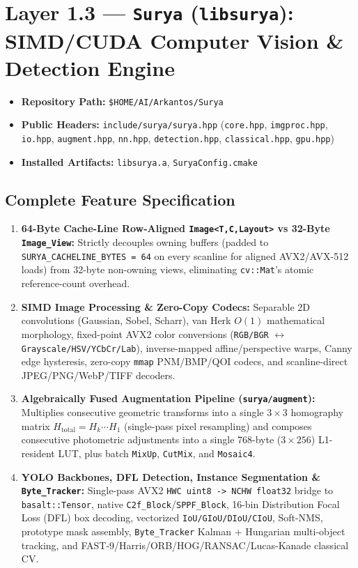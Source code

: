 \documentclass[11pt,a4paper]{article}
\begin{document}
\section{Layer 1.3 --- \texttt{Surya} (\texttt{libsurya}): SIMD/CUDA Computer Vision \& Detection Engine}

\begin{itemize}[leftmargin=1.5em,itemsep=1pt]
  \item \textbf{Repository Path:} \texttt{\$HOME/AI/Arkantos/Surya}
  \item \textbf{Public Headers:} \texttt{include/surya/surya.hpp} (\texttt{core.hpp}, \texttt{imgproc.hpp}, \texttt{io.hpp}, \texttt{augment.hpp}, \texttt{nn.hpp}, \texttt{detection.hpp}, \texttt{classical.hpp}, \texttt{gpu.hpp})
  \item \textbf{Installed Artifacts:} \texttt{libsurya.a}, \texttt{SuryaConfig.cmake}
\end{itemize}

\subsection{Complete Feature Specification}
\begin{enumerate}[leftmargin=1.5em]
  \item \textbf{64-Byte Cache-Line Row-Aligned \texttt{Image<T,C,Layout>} vs 32-Byte \texttt{Image\_View}:} Strictly decouples owning buffers (padded to \texttt{SURYA\_CACHELINE\_BYTES = 64} on every scanline for aligned AVX2/AVX-512 loads) from 32-byte non-owning views, eliminating \texttt{cv::Mat}'s atomic reference-count overhead.
  \item \textbf{SIMD Image Processing \& Zero-Copy Codecs:} Separable 2D convolutions (Gaussian, Sobel, Scharr), van Herk $O(1)$ mathematical morphology, fixed-point AVX2 color conversions (\texttt{RGB/BGR} $\leftrightarrow$ \texttt{Grayscale/HSV/YCbCr/Lab}), inverse-mapped affine/perspective warps, Canny edge hysteresis, zero-copy \texttt{mmap} PNM/BMP/QOI codecs, and scanline-direct JPEG/PNG/WebP/TIFF decoders.
  \item \textbf{Algebraically Fused Augmentation Pipeline (\texttt{surya/augment}):} Multiplies consecutive geometric transforms into a single $3\times 3$ homography matrix $H_{\text{total}} = H_k \cdots H_1$ (single-pass pixel resampling) and composes consecutive photometric adjustments into a single 768-byte ($3\times 256$) L1-resident LUT, plus batch \texttt{MixUp}, \texttt{CutMix}, and \texttt{Mosaic4}.
  \item \textbf{YOLO Backbones, DFL Detection, Instance Segmentation \& \texttt{Byte\_Tracker}:} Single-pass AVX2 \texttt{HWC uint8 -> NCHW float32} bridge to \texttt{basalt::Tensor}, native \texttt{C2f\_Block}/\texttt{SPPF\_Block}, 16-bin Distribution Focal Loss (DFL) box decoding, vectorized \texttt{IoU/GIoU/DIoU/CIoU}, Soft-NMS, prototype mask assembly, \texttt{Byte\_Tracker} Kalman + Hungarian multi-object tracking, and FAST-9/Harris/ORB/HOG/RANSAC/Lucas-Kanade classical CV.
\end{enumerate}
\end{document}
